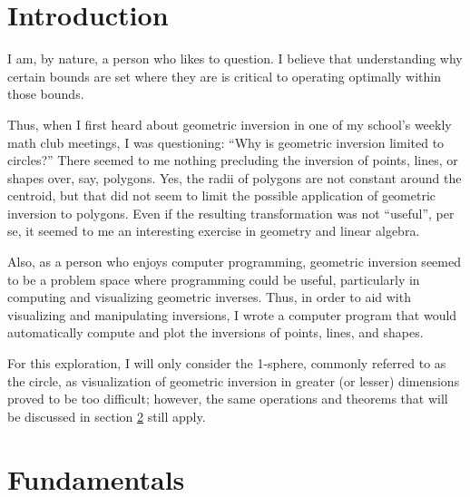 \documentclass[a4paper,12pt]{article}
\numberwithin{figure}{section}
\begin{document}
    
    
    \tableofcontents
    
    \section{Introduction}
    
        I am, by nature, a person who likes to question. I believe that understanding why certain bounds are set where they are is critical to operating optimally within those bounds.
        
        Thus, when I first heard about geometric inversion in one of my school's weekly math club meetings, I was questioning: ``Why is geometric inversion limited to circles?'' There seemed to me nothing precluding the inversion of points, lines, or shapes over, say, polygons. Yes, the radii of polygons are not constant around the centroid, but that did not seem to limit the possible application of geometric inversion to polygons. Even if the resulting transformation was not ``useful'', per se, it seemed to me an interesting exercise in geometry and linear algebra.
        
        Also, as a person who enjoys computer programming, geometric inversion seemed to be a problem space where programming could be useful, particularly in computing and visualizing geometric inverses. Thus, in order to aid with visualizing and manipulating inversions, I wrote a computer program that would automatically compute and plot the inversions of points, lines, and shapes.
        
        For this exploration, I will only consider the 1-sphere, commonly referred to as the circle, as visualization of geometric inversion in greater (or lesser) dimensions proved to be too difficult; however, the same operations and theorems that will be discussed in section \ref{sec:fun} still apply.
        
    \section{Fundamentals}\label{sec:fun}
    
\end{document}
